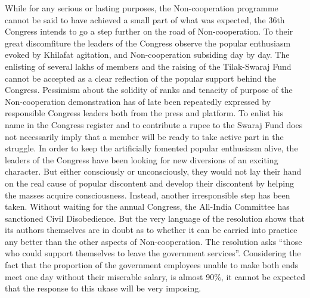 While for any serious or lasting purposes, the Non-cooperation programme cannot be said to have achieved a small part of what was expected, the 36th Congress intends to go a step further on the road of Non-cooperation. To their great discomfiture the leaders of the Congress observe the popular enthusiasm evoked by Khilafat agitation, and Non-cooperation subsiding day by day. The enlisting of several lakhs of members and the raising of the Tilak-Swaraj Fund cannot be accepted as a clear reflection of the popular support behind the Congress. Pessimism about the solidity of ranks and tenacity of purpose of the Non-cooperation demonstration has of late been repeatedly expressed by responsible Congress leaders both from the press and platform. To enlist his name in the Congress register and to contribute a rupee to the Swaraj Fund does not necessarily imply that a member will be ready to take active part in the struggle. In order to keep the artificially fomented popular enthusiasm alive, the leaders of the Congress have been looking for new diversions of an exciting character. But either consciously or unconsciously, they would not lay their hand on the real cause of popular discontent and develop their discontent by helping the masses acquire consciousness. Instead, another irresponsible step has been taken. Without waiting for the annual Congress, the All-India Committee has sanctioned Civil Disobedience. But the very language of the resolution shows that its authors themselves are in doubt as to whether it can be carried into practice any better than the other aspects of Non-cooperation. The resolution asks “those who could support themselves to leave the government services”. Considering the fact that the proportion of the government employees unable to make both ends meet one day without their miserable salary, is almost 90\%, it cannot be expected that the response to this ukase will be very imposing. 


